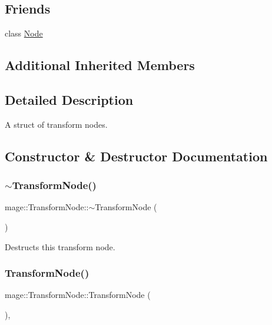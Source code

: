 \subsection*{Friends}
\begin{DoxyCompactItemize}
\item 
class \hyperlink{structmage_1_1_transform_node_a6db9d28bd448a131448276ee03de1e6d}{Node}
\end{DoxyCompactItemize}
\subsection*{Additional Inherited Members}


\subsection{Detailed Description}
A struct of transform nodes. 

\subsection{Constructor \& Destructor Documentation}
\hypertarget{structmage_1_1_transform_node_a0c5e84d99c27cda31dae8106611d682f}{}\label{structmage_1_1_transform_node_a0c5e84d99c27cda31dae8106611d682f} 
\subsubsection{\texorpdfstring{$\sim$\+Transform\+Node()}{~TransformNode()}}
{\footnotesize\ttfamily mage\+::\+Transform\+Node\+::$\sim$\+Transform\+Node (\begin{DoxyParamCaption}{ }\end{DoxyParamCaption})}

Destructs this transform node. \hypertarget{structmage_1_1_transform_node_aec41a87ef5f7bca905e1de4b8959350a}{}\label{structmage_1_1_transform_node_aec41a87ef5f7bca905e1de4b8959350a} 
\subsubsection{\texorpdfstring{Transform\+Node()}{TransformNode()}\hspace{0.1cm}{\footnotesize\ttfamily [1/3]}}
{\footnotesize\ttfamily mage\+::\+Transform\+Node\+::\+Transform\+Node (\begin{DoxyParamCaption}{ }\end{DoxyParamCaption})\hspace{0.3cm}{\ttfamily [explicit]}, {\ttfamily [private]}}

